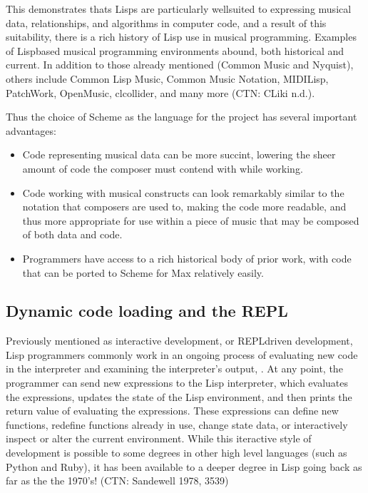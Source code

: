 \documentclass[letterpaper,10pt,english]{sphinxmanual}
\begin{document}
\sphinxAtStartPar
This demonstrates thats Lisps are particularly well\sphinxhyphen{}suited to expressing musical data, relationships, and algorithms in
computer code, and a result of this suitability, there is a rich history of Lisp use in musical programming.
Examples of Lisp\sphinxhyphen{}based musical programming environments abound, both historical and current. In addition
to those already mentioned (Common Music and Nyquist), others include
Common Lisp Music, Common Music Notation, MIDI\sphinxhyphen{}Lisp, PatchWork, OpenMusic, cl\sphinxhyphen{}collider, and many more (CTN: CLiki n.d.).

\sphinxAtStartPar
Thus the choice of Scheme as the language for the project has several important advantages:
\begin{itemize}
\item {} 
\sphinxAtStartPar
Code representing musical data can be more succint, lowering the sheer amount of code the composer must contend with while working.

\item {} 
\sphinxAtStartPar
Code working with musical constructs can look remarkably similar to the notation that composers are used to, making the code
more readable, and thus more appropriate for use within a piece of music that may be composed of both data and code.

\item {} 
\sphinxAtStartPar
Programmers have access to a rich historical body of prior work, with code that can be ported to Scheme for Max relatively easily.

\end{itemize}


\subsection{Dynamic code loading and the REPL}
\label{\detokenize{design:dynamic-code-loading-and-the-repl}}
\sphinxAtStartPar
Previously mentioned as interactive development, or REPL\sphinxhyphen{}driven development, Lisp programmers commonly work in an ongoing process
of evaluating new code in the interpreter and examining the interpreter’s output, .
At any point, the programmer can send new expressions to the Lisp interpreter, which evaluates the expressions, updates
the state of the Lisp environment, and then prints the return value of evaluating the expressions.
These expressions can define new functions, redefine functions already in use, change state data, or
interactively inspect or alter the current environment. While this iteractive style of development is possible
to some degrees in other high level languages (such as Python and Ruby), it has been available to a deeper degree in Lisp going
back as far as the the 1970’s! (CTN: Sandewell 1978, 35\sphinxhyphen{}39)
\end{document}
